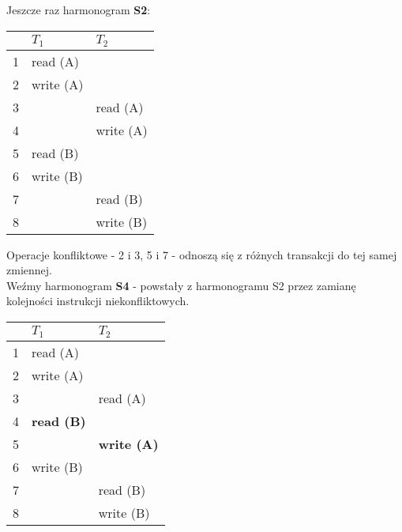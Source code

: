 \documentclass[main.tex]{subfiles}
\begin{document}
    \noindent Jeszcze raz harmonogram \textbf{S2}:
    \begin{table}[H]
        \begin{center}
            \begin{tabular}{| p{0.8cm} | p{6cm} | p{6cm} |}
                \hline
                & $T_1$ & $T_2$\\
                \hline
                \hline
                1 & read (A) &\\
                \hline
                2 & write (A) &\\
                \hline
                3 & & read (A)\\
                \hline
                4 & & write (A)\\
                \hline
                5 & read (B) &\\
                \hline
                6 & write (B) &\\
                \hline
                7 & & read (B)\\
                \hline
                8 & & write (B)\\
                \hline
            \end{tabular}
        \end{center}
    \end{table}

    Operacje konfliktowe - 2 i 3, 5 i 7 - odnoszą się z różnych transakcji do tej samej zmiennej.\\

    \noindent Weźmy harmonogram \textbf{S4} - powstały z harmonogramu S2 przez zamianę kolejności instrukcji niekonfliktowych.
    \begin{table}[H]
        \begin{center}
            \begin{tabular}{| p{0.8cm} | p{6cm} | p{6cm} |}
                \hline
                & $T_1$ & $T_2$\\
                \hline
                \hline
                1 & read (A) &\\
                \hline
                2 & write (A) &\\
                \hline
                3 & & read (A)\\
                \hline
                4 & \textbf{read (B)} &\\
                \hline
                5 & & \textbf{write (A)}\\
                \hline
                6 & write (B) &\\
                \hline
                7 & & read (B)\\
                \hline
                8 & & write (B)\\
                \hline
            \end{tabular}
        \end{center}
    \end{table}
\end{document}
